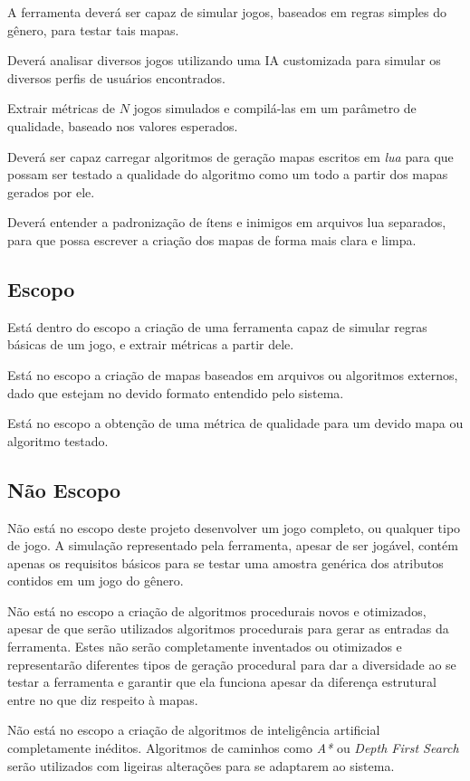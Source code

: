 A ferramenta deverá ser capaz de simular jogos, baseados em regras simples do gênero, para testar tais mapas.

Deverá analisar diversos jogos utilizando uma IA customizada para simular os diversos perfis de usuários encontrados.

Extrair métricas de $N$ jogos simulados e compilá-las em um parâmetro de qualidade, baseado nos valores esperados.

Deverá ser capaz carregar algoritmos de geração mapas escritos em \textit{lua} para que possam ser testado a qualidade do algoritmo como um todo  a partir dos mapas gerados por ele.

Deverá entender a padronização de ítens e inimigos em arquivos lua separados, para que possa escrever a criação dos mapas de forma mais clara e limpa.

\subsection{Escopo}

Está dentro do escopo a criação de uma ferramenta capaz de simular regras básicas de um jogo, e extrair métricas a partir dele. 

Está no escopo a criação de mapas baseados em arquivos ou algoritmos externos, dado que estejam no devido formato entendido pelo sistema.

Está no escopo a obtenção de uma métrica de qualidade para um devido mapa ou algoritmo testado.

\subsection{Não Escopo}

Não está no escopo deste projeto desenvolver um jogo completo, ou qualquer tipo de jogo. A simulação representado pela ferramenta, apesar de ser jogável, contém apenas os requisitos básicos para se testar uma amostra genérica dos atributos contidos em um jogo do gênero.

Não está no escopo a criação de algoritmos procedurais novos e otimizados, apesar de que serão utilizados algoritmos procedurais para gerar as entradas da ferramenta. Estes não serão completamente inventados ou otimizados e representarão diferentes tipos de geração procedural para dar a diversidade ao se testar a ferramenta e garantir que ela funciona apesar da diferença estrutural entre no que diz respeito à mapas.

Não está no escopo a criação de algoritmos de inteligência artificial completamente inéditos. Algoritmos de caminhos como \textit{A*} ou \textit{Depth First Search} serão utilizados com ligeiras alterações para se adaptarem ao sistema. 